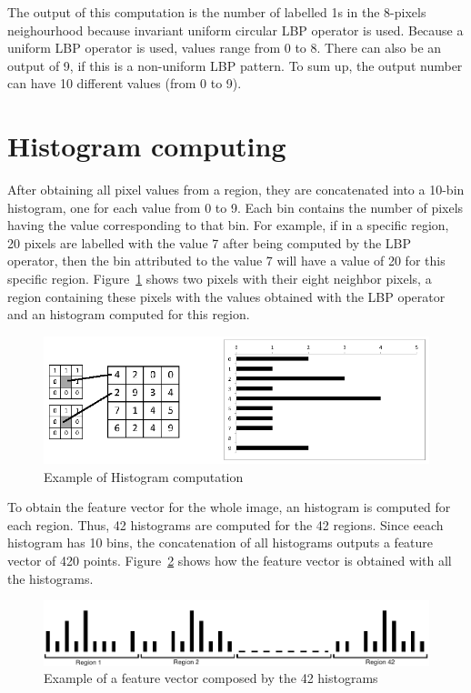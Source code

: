 \noindent The output of this computation is the number of labelled 1s in the 8-pixels neighourhood because invariant uniform circular LBP operator is used. Because a uniform LBP operator is used, values range from 0 to 8. There can also be an output of 9, if this is a non-uniform LBP pattern. To sum up, the output number can have 10 different values (from 0 to 9).
\newline

\section{Histogram computing}

\vspace{\baselineskip}
After obtaining all pixel values from a region, they are concatenated into a 10-bin histogram, one for each value from 0 to 9. Each bin contains the number of pixels having the value corresponding to that bin. For example, if in a specific region, 20 pixels are labelled with the value 7 after being computed by the LBP operator, then the bin attributed to the value 7 will have a value of 20 for this specific region. Figure~\ref{lbp_implementation_histogram} shows two pixels with their eight neighbor pixels, a region containing these pixels with the values obtained with the LBP operator and an histogram computed for this region.
\newline

\begin{figure}[!h]
\begin{center}
\noindent \includegraphics[scale=0.5]{figures/lbp_implementation_histogram} 
\newline
\caption{Example of Histogram computation}
\label{lbp_implementation_histogram}
\end{center} 
\end{figure}

\noindent To obtain the feature vector for the whole image, an histogram is computed for each region. Thus, 42 histograms are computed for the 42 regions. Since eeach histogram has 10 bins, the concatenation of all histograms outputs a feature vector of 420 points. Figure~\ref{lbp_implementation_vector} shows how the feature vector is obtained with all the histograms.
\newline

\begin{figure}[!h]
\begin{center}
\noindent \includegraphics[scale=0.4]{figures/lbp_implementation_vector} 
\newline
\caption{Example of a feature vector composed by the 42 histograms}
\label{lbp_implementation_vector}
\end{center} 
\end{figure}

